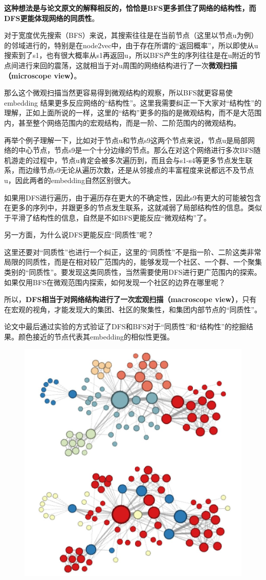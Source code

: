 \documentclass[12pt]{article}
\begin{document}
\begin{framed}
\textbf{这种想法是与论文原文的解释相反的，恰恰是BFS更多抓住了网络的结构性，而DFS更能体现网络的同质性}。

对于宽度优先搜索（BFS）来说，其搜索往往是在当前节点（这里以节点u为例）的邻域进行的，特别是在node2vec中，由于存在所谓的“返回概率”，所以即使从u搜索到了s1，也有很大概率从s1再返回u，所以BFS产生的序列往往是在u附近的节点间进行来回的震荡，这就相当于对u周围的网络结构进行了一次\textbf{微观扫描（microscope view）}。

那么这个微观扫描当然更容易得到微观结构的观察，所以BFS就更容易使 embedding 结果更多反应网络的“结构性”。这里我需要纠正一下大家对“结构性”的理解，正如上面所说的一样，这里的“结构”更多的指的是微观结构，而不是大范围内，甚至整个网络范围内的宏观结构，而是一阶、二阶范围内的微观结构。

再举个例子理解一下，比如对于节点u和节点s9这两个节点来说，节点u是局部网络的中心节点，节点s9是一个十分边缘的节点。那么在对这个网络进行多次BFS随机游走的过程中，节点u肯定会被多次遍历到，而且会与s1-s4等更多节点发生联系，而边缘节点s9无论从遍历次数，还是从邻接点的丰富程度来说都远不及节点u，因此两者的embedding自然区别很大。

如果用DFS进行遍历，由于遍历存在更大的不确定性，因此s9有更大的可能被包含在更多的序列中，并跟更多的节点发生联系，这就减弱了局部结构性的信息。类似于平滑了结构性的信息，自然是不如BFS更能反应“微观结构”了。

另一方面，为什么说DFS更能反应“同质性”呢？

这里还要对“同质性”也进行一个纠正，这里的“同质性”不是指一阶、二阶这类非常局限的同质性，而是在相对较广范围内的，能够发现一个社区、一个群、一个聚集类别的“同质性”。要发现这类同质性，当然需要使用DFS进行更广范围内的探索。如果仅用BFS在微观范围内探索，如何发现一个社区的边界在哪里呢？

所以，\textbf{DFS相当于对网络结构进行了一次宏观扫描（macroscope view）}，只有在宏观的视角，才能发现大的集团、社区的聚集性，和集团内部节点的“同质性”。

论文中最后通过实验的方式验证了DFS和BFS对于“同质性”和“结构性”的挖掘结果。颜色接近的节点代表其embedding的相似性更强。

\begin{figure}[H]
    \centering
    \includegraphics[width=.6\textwidth]{fig/Graph_Embedding_BFS_DFS_Diff.jpg}
\end{figure}


\end{framed}
\end{document}
